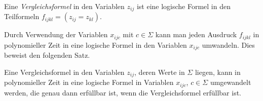 \begin{definition}
Eine {\em Vergleichsformel} in den Variablen $z_{ij}$ ist eine
logische Formel in den Teilformeln $f_{ijkl}=(z_{ij}=z_{kl})$.
\end{definition}

Durch Verwendung der Variablen $x_{ijc}$ mit $c\in\Sigma$ kann man
jeden Ausdruck $f_{ijkl}$ in polynomieller Zeit in eine logische
Formel in den Variablen $x_{ijc}$ umwandeln.
Dies beweist den folgenden Satz.

\begin{satz}
\label{skript:satz:vergleichsformel}
Eine Vergleichsformel in den Variablen $z_{ij}$, deren Werte in $\Sigma$
liegen, kann in polynomieller Zeit in eine logische Formel in Variablen
$x_{ijc}$, $c\in\Sigma$ umgewandelt werden, die genau dann erfüllbar ist,
wenn die Vergleichsformel erfüllbar ist.
\end{satz}






